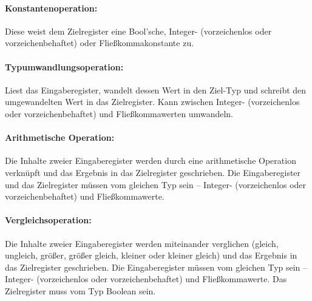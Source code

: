 \documentclass[twoside,a4paper,fleqn,12pt]{article}
\begin{document}
\paragraph{Konstantenoperation:} Diese weist dem Zielregister eine Bool'sche, Integer- (vorzeichenlos oder vorzeichenbehaftet) oder
Fließkommakonstante zu.

\paragraph{Typumwandlungsoperation:} Liest das Eingaberegister, wandelt dessen Wert in den Ziel-Typ und schreibt den umgewandelten Wert in das Zielregister.
Kann zwischen Integer- (vorzeichenlos oder vorzeichenbehaftet) und Fließkommawerten umwandeln.

\paragraph{Arithmetische Operation:} Die Inhalte zweier Eingaberegister 
werden durch eine arithmetische Operation verknüpft und das Ergebnis in das Zielregister geschrieben.
Die Eingaberegister und das Zielregister müssen vom gleichen Typ sein -- Integer- (vorzeichenlos oder vorzeichenbehaftet) und Fließkommawerte.

\paragraph{Vergleichsoperation:} Die Inhalte zweier Eingaberegister 
werden miteinander verglichen (gleich, ungleich, größer, größer gleich, kleiner oder kleiner gleich) und das Ergebnis in das Zielregister geschrieben.
Die Eingaberegister müssen vom gleichen Typ sein -- Integer- (vorzeichenlos oder vorzeichenbehaftet) und Fließkommawerte.
Das Zielregister muss vom Typ Boolean sein.
\end{document}
